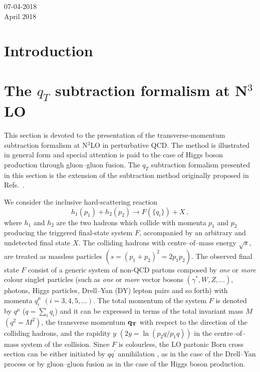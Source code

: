 \documentclass[12pt]{article}
\def\to{\rightarrow}
\def\qt{q_T}
\begin{document}
\begin{titlepage}
\begin{quote}
\end{quote}
\vspace*{\fill}
\begin{flushleft}
07-04-2018  \\ April 2018
\end{flushleft}
\end{titlepage}
\setcounter{footnote}{1}
\renewcommand{\thefootnote}{\fnsymbol{footnote}}
\section{Introduction}
\label{sec:intro}
\section{The $\qt$ subtraction formalism at N$^{3}$LO}
\label{sec:forma}
This section is devoted to the presentation of the transverse-momentum subtraction formalism at N$^{3}$LO in perturbative QCD. The method is illustrated in general form and special attention is paid to the case of Higgs boson production through gluon--gluon fusion. The $\qt$ subtraction formalism presented in this section  is the extension of the subtraction method originally proposed in Refs.~\cite{Catani:2007vq,Bozzi:2005wk,Bozzi:2003jy}.

We consider the inclusive hard-scattering reaction 
\begin{equation}
h_1(p_1)+h_2(p_2)\to F(\{q_i\})+X\, ,
\label{class}
\end{equation}
where $h_1$ and $h_2$ are the two hadrons which collide with momenta $p_1$ and $p_2$ producing the triggered final-state system $F$, accompanied by an arbitrary and undetected final state $X$. The colliding hadrons with centre--of--mass energy $\sqrt s$, are treated as massless particles $(s= (p_1+p_2)^2 = 2p_1p_2)$. The observed final state $F$ consist of a generic system of non-QCD partons composed by {\em one} or {\em more} colour singlet particles (such as {\em one} or {\em more} vector bosons $(\gamma^*, W, Z, \dots)$, photons, Higgs particles, Drell--Yan (DY) lepton pairs and so forth) with momenta $q_i^{\mu}$ $(i=3,4,5,\dots)$. The total momentum of the system $F$ is denoted by $q^{\mu}$ ($q=\sum_i q_i$) and it can be expressed in terms of the total invariant mass $M$ $(q^2=M^2)$, the transverse momentum $\bf \qt$ with respect to the direction of the colliding hadrons, and the rapidity $y$ $(2y = \ln (p_2q/p_1q))$ in the centre--of--mass system of the collision. 
Since $F$ is colourless, the LO partonic Born cross section can be either initiated by $qq^{\prime}$ annihilation
, as in the case of the Drell--Yan process or by gluon--gluon fusion as in the case of the Higgs boson production.
\end{document}
